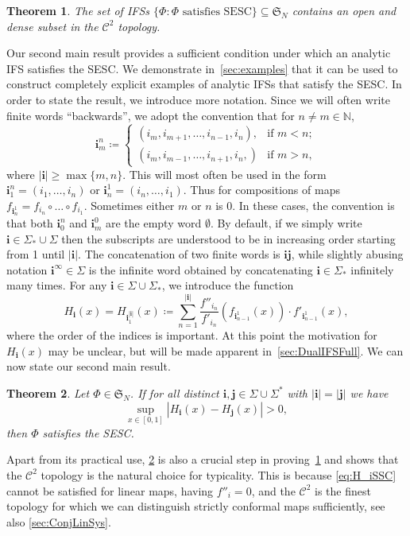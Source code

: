 \documentclass[11pt,]{article}
\def\cref#1{\ref{#1}}%
\newtheorem{theorem}{Theorem}[section]
\theoremstyle{definition}
\theoremstyle{remark}
\newcommand{\0}{\mathbf{0}}
\newcommand{\bi}{\mathbf{i}}
\newcommand{\bj}{\mathbf{j}}
\begin{document}
\begin{theorem}\label{thm:ESCOpenDense}
  The set of IFSs $\{\Phi \colon \Phi\text{ satisfies SESC}\}\subseteq \mathfrak{S}_N$ contains an open and
  dense subset in the $\mathcal{C}^2$ topology.
\end{theorem}
Our second main result provides a sufficient condition under which an analytic IFS satisfies the
SESC. We demonstrate in~\cref{sec:examples} that it can be used to construct completely explicit
examples of analytic IFSs that satisfy the SESC. In order to state the result, we introduce more
notation. Since we will often write finite words ``backwards'', we adopt the convention that for
$n\neq m\in\mathbb{N}$,
\begin{equation*}
	\bi_m^n\coloneqq
	\begin{cases}
		(i_m,i_{m+1},\ldots,i_{n-1},i_n), &\text{if } m<n; \\
		(i_m,i_{m-1},\ldots,i_{n+1},i_n,) &\text{if } m>n,
	\end{cases}
\end{equation*}
where $|\bi|\geq\max\{m,n\}$. This will most often be used in the form $\bi_1^n=(i_1,\ldots,i_n)$ or
$\bi_n^1=(i_n,\ldots,i_1)$. Thus for compositions of maps $f_{\bi_n^1}=f_{i_n}\circ \dots \circ
f_{i_1}$. Sometimes either $m$ or $n$ is $0$. In these cases, the convention is that both $\bi_0^n$
and $\bi_m^0$ are the empty word $\emptyset$. By default, if we simply write
$\bi\in\Sigma_*\cup\Sigma$ then the subscripts are understood to be in increasing order starting
from 1 until $|\bi|$. The concatenation of two finite words is $\bi\bj$, while slightly abusing
notation $\bi^{\infty}\in \Sigma$ is the infinite word obtained by concatenating $\bi\in\Sigma_*$
infinitely many times. 
For any $\bi\in \Sigma\cup\Sigma_*$, we introduce the function 
\begin{equation}\label{eq:H_i(x)}
H_{\bi}(x)=H_{\bi_{1}^{|\bi|}}(x) \coloneqq \sum_{n=1}^{|\bi|}
\frac{f''_{i_n}}{f'_{i_n}}(f_{\bi_{n-1}^1}(x))\cdot f'_{\bi_{n-1}^1}(x),
\end{equation}
where the order of the indices is important. At this point the motivation for $H_{\bi}(x)$ may be unclear,
but will be made apparent in~\cref{sec:DualIFSFull}. 
We can now state our second main result.
\begin{theorem}
  \label{thm:main}
  Let $\Phi\in\mathfrak{S}_N$. If for all distinct $\bi,\bj \in\Sigma\cup\Sigma^*$ with $|\bi|=|\bj|$ we have
\begin{equation}\label{eq:H_iSSC}
    \sup_{x\in[0,1]} |H_{\bi}(x) - H_{\bj}(x)| > 0,
\end{equation}
then $\Phi$ satisfies the SESC.
\end{theorem}
Apart from its practical use, \cref{thm:main} is also a crucial step in
proving~\cref{thm:ESCOpenDense} and shows that the $\mathcal{C}^2$ topology
is the natural choice for typicality.
This is because \cref{eq:H_iSSC} cannot be satisfied for linear maps, having $f''_i =0$, and the $\mathcal{C}^2$
is the finest topology for which we can distinguish strictly conformal maps sufficiently, see also
\cref{sec:ConjLinSys}.
\end{document}
